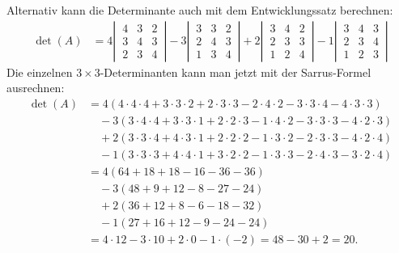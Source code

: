 \begin{loesung}
Alternativ kann die Determinante auch mit dem Entwicklungssatz berechnen:
\begin{align*}
\det(A)
&=
4
\left|\,
\begin{matrix}
4&3&2\\
3&4&3\\
2&3&4
\end{matrix}
\,\right|
-3
\left|\,
\begin{matrix}
3&3&2\\
2&4&3\\
1&3&4
\end{matrix}
\,\right|
+2
\left|\,
\begin{matrix}
3&4&2\\
2&3&3\\
1&2&4
\end{matrix}
\,\right|
-1
\left|\,
\begin{matrix}
3&4&3\\
2&3&4\\
1&2&3
\end{matrix}
\,\right|
\end{align*}
Die einzelnen $3\times 3$-Determinanten kann man jetzt mit der Sarrus-Formel
ausrechnen:
\begin{align*}
\det(A)
&=
4(4\cdot 4\cdot 4 + 3\cdot 3\cdot 2 +2\cdot 3 \cdot 3
-2\cdot 4\cdot 2-3\cdot 3\cdot 4-4\cdot 3\cdot 3)
\\
&\quad-3(3\cdot 4\cdot 4+3\cdot 3\cdot 1+2\cdot 2\cdot 3
-1\cdot 4\cdot 2-3\cdot 3\cdot 3-4\cdot 2\cdot 3)
\\
&\quad+2(3\cdot 3\cdot 4+4\cdot 3\cdot 1+2\cdot 2\cdot 2
-1\cdot 3\cdot 2-2\cdot 3\cdot 3-4\cdot 2\cdot 4)
\\
&\quad-1(3\cdot 3\cdot 3+4\cdot 4\cdot 1+3\cdot 2\cdot 2
-1\cdot 3\cdot 3-2\cdot 4\cdot 3 - 3\cdot 2\cdot 4)
\\
&=
4(64 + 18 + 18 -16-36-36)
\\
&\quad-3(48+9+12 -8-27-24)
\\
&\quad+2(36+12+8 -6-18-32)
\\
&\quad-1(27+16+12 -9-24 - 24)
\\
&=
4\cdot 12
-3\cdot 10
+2\cdot 0
-1\cdot (-2)
=48-30+2=20.
\end{align*}
\end{loesung}
